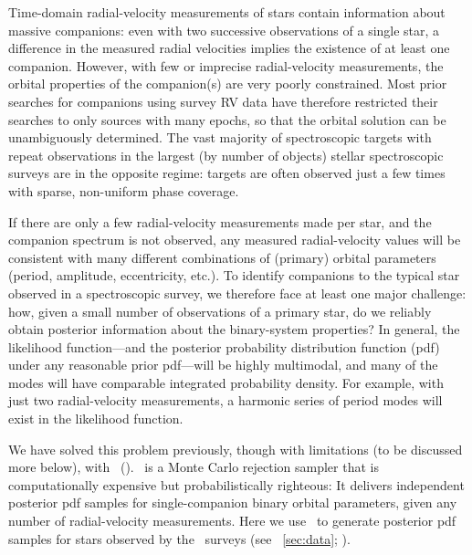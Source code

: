 \documentclass[modern, letterpaper]{aastex61}
\newcommand{\apogee}{\project{\acronym{APOGEE}}}
\newcommand{\thejoker}{\project{The~Joker}}
\begin{document}
Time-domain radial-velocity measurements of stars contain information about
massive companions: even with two successive observations of a single star, a
difference in the measured radial velocities implies the existence of at least
one companion.
However, with few or imprecise radial-velocity measurements, the orbital
properties of the companion(s) are very poorly constrained.
Most prior searches for companions using survey RV data have therefore
restricted their searches to only sources with many epochs, so that the orbital
solution can be unambiguously determined.
The vast majority of spectroscopic targets with repeat observations in the
largest (by number of objects) stellar spectroscopic surveys are in the opposite
regime: targets are often observed just a few times with sparse, non-uniform
phase coverage.


If there are only a few radial-velocity measurements made per star, and the
companion spectrum is not observed, any measured radial-velocity values will be
consistent with many different combinations of (primary) orbital parameters
(period, amplitude, eccentricity, etc.).
To identify companions to the typical star observed in a spectroscopic survey,
we therefore face at least one major challenge: how, given a small number of
observations of a primary star, do we reliably obtain posterior information
about the binary-system properties?
In general, the likelihood function---and the posterior probability distribution
function (pdf) under any reasonable prior pdf---will be highly multimodal, and
many of the modes will have comparable integrated probability density.
For example, with just two radial-velocity measurements, a harmonic series of
period modes will exist in the likelihood function.

We have solved this problem previously, though with limitations (to be discussed
more below), with \thejoker\ (\citealt{Price-Whelan:2017}).
\thejoker\ is a Monte Carlo rejection sampler that is computationally expensive
but probabilistically righteous:
It delivers independent posterior pdf samples for single-companion binary
orbital parameters, given any number of radial-velocity measurements.
Here we use \thejoker\ to generate posterior pdf samples for  stars
observed by the \apogee\ surveys (see \sectionname~\ref{sec:data};
\citealt{Majewski:2015}).
\end{document}
